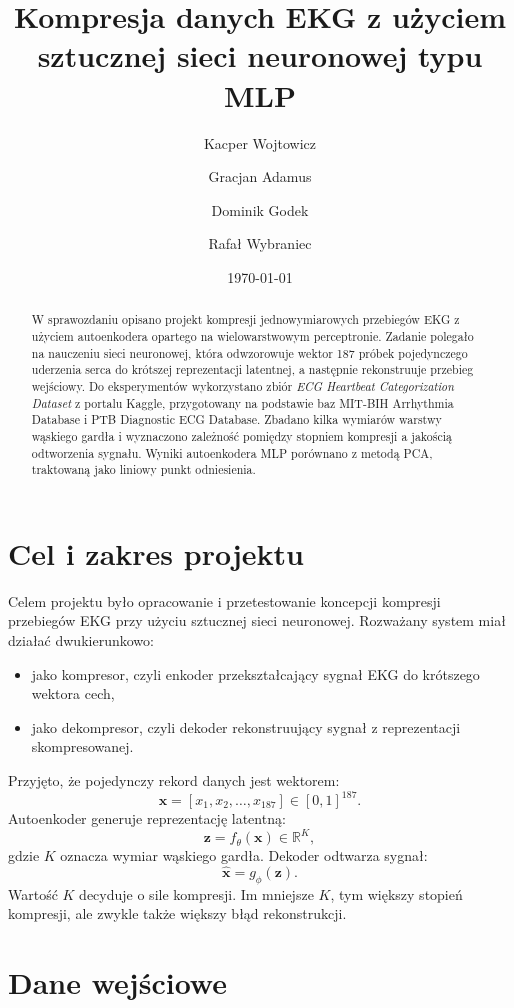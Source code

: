 \documentclass[12pt,a4paper]{article}
\title{Kompresja danych EKG z użyciem sztucznej sieci neuronowej typu MLP}
\author{Kacper Wojtowicz \and Gracjan Adamus \and Dominik Godek \and Rafał Wybraniec}
\date{\today}
\begin{document}
\maketitle

\begin{abstract}
W sprawozdaniu opisano projekt kompresji jednowymiarowych przebiegów EKG z użyciem autoenkodera opartego na wielowarstwowym perceptronie. Zadanie polegało na nauczeniu sieci neuronowej, która odwzorowuje wektor 187 próbek pojedynczego uderzenia serca do krótszej reprezentacji latentnej, a następnie rekonstruuje przebieg wejściowy. Do eksperymentów wykorzystano zbiór \textit{ECG Heartbeat Categorization Dataset} z portalu Kaggle, przygotowany na podstawie baz MIT-BIH Arrhythmia Database i PTB Diagnostic ECG Database. Zbadano kilka wymiarów warstwy wąskiego gardła i wyznaczono zależność pomiędzy stopniem kompresji a jakością odtworzenia sygnału. Wyniki autoenkodera MLP porównano z metodą PCA, traktowaną jako liniowy punkt odniesienia.
\end{abstract}

\tableofcontents
\newpage

\section{Cel i zakres projektu}
Celem projektu było opracowanie i przetestowanie koncepcji kompresji przebiegów EKG przy użyciu sztucznej sieci neuronowej. Rozważany system miał działać dwukierunkowo:
\begin{itemize}
    \item jako kompresor, czyli enkoder przekształcający sygnał EKG do krótszego wektora cech,
    \item jako dekompresor, czyli dekoder rekonstruujący sygnał z reprezentacji skompresowanej.
\end{itemize}

Przyjęto, że pojedynczy rekord danych jest wektorem:
\[
    \mathbf{x} = [x_1, x_2, \ldots, x_{187}] \in [0,1]^{187}.
\]
Autoenkoder generuje reprezentację latentną:
\[
    \mathbf{z} = f_\theta(\mathbf{x}) \in \mathbb{R}^{K},
\]
gdzie $K$ oznacza wymiar wąskiego gardła. Dekoder odtwarza sygnał:
\[
    \hat{\mathbf{x}} = g_\phi(\mathbf{z}).
\]
Wartość $K$ decyduje o sile kompresji. Im mniejsze $K$, tym większy stopień kompresji, ale zwykle także większy błąd rekonstrukcji.

\section{Dane wejściowe}
\end{document}
